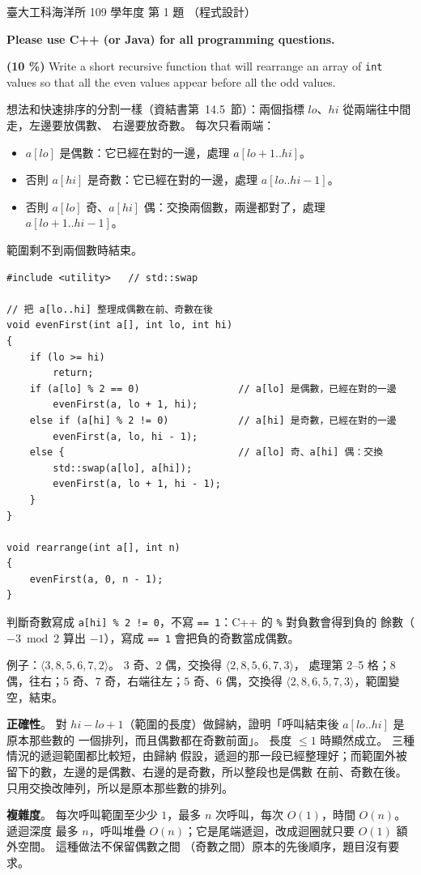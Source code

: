\begin{pastexam}[label={px:ntu-109-esoe-ds-01}]{臺大工科海洋所 109 學年度 第 1 題}
（程式設計）

\textbf{Please use C++ (or Java) for all programming questions.}

\textbf{(10 \%)} Write a short recursive function that will rearrange an array of \texttt{int}
values so that all the even values appear before all the odd values.
\end{pastexam}

\begin{pastsoln}
想法和快速排序的分割一樣（資結書第~14.5~節）：兩個指標 $lo$、$hi$ 從兩端往中間走，左邊要放偶數、
右邊要放奇數。 每次只看兩端：
\begin{itemize}
\item $a[lo]$ 是偶數：它已經在對的一邊，處理 $a[lo+1..hi]$。
\item 否則 $a[hi]$ 是奇數：它已經在對的一邊，處理 $a[lo..hi-1]$。
\item 否則 $a[lo]$ 奇、$a[hi]$ 偶：交換兩個數，兩邊都對了，處理 $a[lo+1..hi-1]$。
\end{itemize}
範圍剩不到兩個數時結束。

\begin{verbatim}
#include <utility>   // std::swap

// 把 a[lo..hi] 整理成偶數在前、奇數在後
void evenFirst(int a[], int lo, int hi)
{
    if (lo >= hi)
        return;
    if (a[lo] % 2 == 0)                 // a[lo] 是偶數，已經在對的一邊
        evenFirst(a, lo + 1, hi);
    else if (a[hi] % 2 != 0)            // a[hi] 是奇數，已經在對的一邊
        evenFirst(a, lo, hi - 1);
    else {                              // a[lo] 奇、a[hi] 偶：交換
        std::swap(a[lo], a[hi]);
        evenFirst(a, lo + 1, hi - 1);
    }
}

void rearrange(int a[], int n)
{
    evenFirst(a, 0, n - 1);
}
\end{verbatim}

判斷奇數寫成 \texttt{a[hi] \% 2 != 0}，不寫 \texttt{== 1}：C++ 的 \texttt{\%} 對負數會得到負的
餘數（$-3 \bmod 2$ 算出 $-1$），寫成 \texttt{== 1} 會把負的奇數當成偶數。

例子：$\langle 3, 8, 5, 6, 7, 2\rangle$。 $3$ 奇、$2$ 偶，交換得 $\langle 2, 8, 5, 6, 7, 3\rangle$，
處理第 2--5 格；$8$ 偶，往右；$5$ 奇、$7$ 奇，右端往左；$5$ 奇、$6$ 偶，交換得
$\langle 2, 8, 6, 5, 7, 3\rangle$，範圍變空，結束。

\textbf{正確性}。 對 $hi - lo + 1$（範圍的長度）做歸納，證明「呼叫結束後 $a[lo..hi]$ 是原本那些數的
一個排列，而且偶數都在奇數前面」。 長度 $\le 1$ 時顯然成立。 三種情況的遞迴範圍都比較短，由歸納
假設，遞迴的那一段已經整理好；而範圍外被留下的數，左邊的是偶數、右邊的是奇數，所以整段也是偶數
在前、奇數在後。 只用交換改陣列，所以是原本那些數的排列。

\textbf{複雜度}。 每次呼叫範圍至少少 $1$，最多 $n$ 次呼叫，每次 $O(1)$，時間 $O(n)$。 遞迴深度
最多 $n$，呼叫堆疊 $O(n)$；它是尾端遞迴，改成迴圈就只要 $O(1)$ 額外空間。 這種做法不保留偶數之間
（奇數之間）原本的先後順序，題目沒有要求。
\end{pastsoln}
